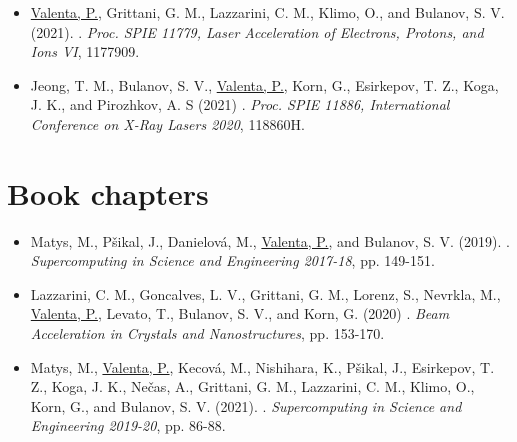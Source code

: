 \documentclass[10pt, a4paper, twoside, openright]{report}
\newcommand{\link}[3][blue]{\href{#2}{\color{#1}{#3}}}%
\begin{document}
\begin{itemize}
	\item \underline{Valenta, P.}, Grittani, G. M., Lazzarini, C. M., Klimo, O., and Bulanov, S. V. (2021). \link{https://doi.org/10.1117/12.2589222}{Ring-shaped electron beams from laser-wakefield accelerator}. \textit{Proc. SPIE 11779, Laser Acceleration of Electrons, Protons, and Ions VI}, 1177909.
	
	\item Jeong, T. M., Bulanov, S. V., \underline{Valenta, P.}, Korn, G., Esirkepov, T. Z., Koga, J. K., and Pirozhkov, A. S (2021) \link{https://doi.org/10.1117/12.2592047}{Ultra-strong attosecond laser focus produced by a relativistic-flying parabolic mirror}. \textit{Proc. SPIE 11886, International Conference on X-Ray Lasers 2020}, 118860H.
	
\end{itemize}

\section{Book chapters\label{sec:book_chapters}}

\begin{itemize}
	
	\item Matys, M., Pšikal, J., Danielová, M., \underline{Valenta, P.}, and Bulanov, S. V. (2019). \link{https://www.it4i.cz/cs/file/abd1875ff7d0e6f59799c4f470545516/173/Supercomputing-in-Science-and-Engineering_preview.pdf}{Laser-driven ion acceleration using cryogenic hydrogen targets}. \textit{Supercomputing in Science and Engineering 2017-18}, pp. 149-151.
	
	\item Lazzarini, C. M., Goncalves, L. V., Grittani, G. M., Lorenz, S., Nevrkla, M., \underline{Valenta, P.}, Levato, T., Bulanov, S. V., and Korn, G. (2020) \link{https://doi.org/10.1142/9789811217135_0010}{Electron acceleration at ELI Beamlines: towards high-energy and high-repetition-rate accelerators}. \textit{Beam Acceleration in Crystals and Nanostructures}, pp. 153-170.
	
	\item Matys, M., \underline{Valenta, P.}, Kecová, M., Nishihara, K., Pšikal, J., Esirkepov, T. Z., Koga, J. K., Nečas, A., Grittani, G. M., Lazzarini, C. M., Klimo, O., Korn, G., and Bulanov, S. V. (2021). \link{https://www.it4i.cz/file/be151db89e56452e36511f5410126441/6419/Supercomputing\%20in\%20Science\%20and\%20Engineering\%202019-2020.pdf}{Laser-driven acceleration of charged particles}. \textit{Supercomputing in Science and Engineering 2019-20}, pp. 86-88.
	
\end{itemize}
\end{document}
